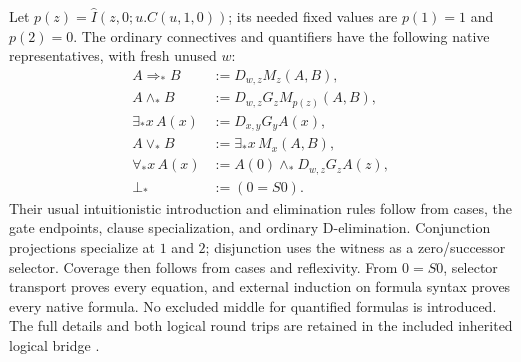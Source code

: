 \documentclass[11pt]{article}
\theoremstyle{definition}\newtheorem{definition}[theorem]{Definition}
\begin{document}
Let $p(z)=\widehat I(z,0;u.C(u,1,0))$; its needed fixed values are
$p(1)=1$ and $p(2)=0$. The ordinary connectives and quantifiers have
the following native representatives, with fresh unused $w$:
\begin{align*}
 A\Rightarrow_*B&:=D_{w,z}M_z(A,B),\\
 A\wedge_*B&:=D_{w,z}G_zM_{p(z)}(A,B),\\
 \exists_*x\,A(x)&:=D_{x,y}G_yA(x),\\
 A\vee_*B&:=\exists_*x\,M_x(A,B),\\
 \forall_*x\,A(x)&:=A(0)\wedge_*D_{w,z}G_zA(z),\\
 \bot_*&:=(0=S0).
\end{align*}
Their usual intuitionistic introduction and elimination rules follow
from cases, the gate endpoints, clause specialization, and ordinary
D-elimination. Conjunction projections specialize at $1$ and $2$;
disjunction uses the witness as a zero/successor selector. Coverage
then follows from cases and reflexivity. From $0=S0$, selector
transport proves every equation, and external induction on formula
syntax proves every native formula. No excluded middle for quantified
formulas is introduced. The full details and both logical round trips
are retained in the included inherited logical bridge \cite{foundations}.
\end{document}
